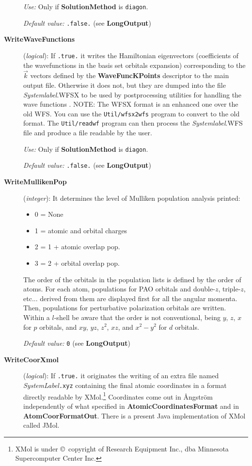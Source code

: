 \documentclass[11pt]{article}
\begin{document}
\begin{description}
{\it Use:} Only if {\bf SolutionMethod} is {\tt diagon}.
 
{\it Default value:} {\tt .false.} (see {\bf LongOutput})

\item[{\bf WriteWaveFunctions}] ({\it logical}): 
 If {\tt .true.} it writes
the Hamiltonian eigenvectors (coefficients of the wavefunctions
in the basis set orbitals expansion) corresponding to the $\vec k$ vectors
defined by the {\bf WaveFuncKPoints}
descriptor to the main output file.  Otherwise it does
not, but they are dumped into the file {\it Systemlabel}.WFSX
to be used by postprocessing utilities for handling the 
wave functions
. NOTE: The WFSX format is an enhanced one
over the old WFS. You can use the {\tt Util/wfsx2wfs} program to
convert to the old format. The {\tt Util/readwf} program
can then process the {\it Systemlabel}.WFS file and produce
a file readable by the user.

{\it Use:} Only if {\bf SolutionMethod} is {\tt diagon}.
 
{\it Default value:} {\tt .false.} (see {\bf LongOutput})


\item[{\bf WriteMullikenPop}] ({\it integer}): 
It determines the level of Mulliken population analysis printed:
\begin{itemize}
\item 0 = None
\item 1 = atomic and orbital charges
\item 2 = 1 + atomic overlap pop.
\item 3 = 2 + orbital overlap pop.
\end{itemize}
The order of the orbitals in the population lists is defined
by the order of atoms. For each atom, populations for PAO orbitals and
double-$z$, triple-$z$, etc... derived from them are displayed first for 
all the angular momenta. Then, populations for perturbative polarization
orbitals are written.
Within a $l$-shell be aware that the order is not
conventional, being $y$, $z$, $x$ for $p$ orbitals, and
$xy$, $yz$, $z^2$, $xz$, and $x^2-y^2$ for $d$ orbitals. 

{\it Default value:} {\tt 0} (see {\bf LongOutput})


\item[{\bf WriteCoorXmol}] ({\it logical}): 
If {\tt .true.} it originates the writing of an extra file
named {\it SystemLabel}{\tt .xyz} containing the final atomic
coordinates in a format directly readable by {\sc XMol}.\footnote{XMol
is under \copyright\ copyright of Research Equipment Inc., dba Minnesota
Supercomputer Center Inc.} Coordinates come out in {\AA}ngstr\"om
independently of what specified in {\bf AtomicCoordinatesFormat} and
in {\bf AtomCoorFormatOut}. There is a present {\sc Java} implementation 
of {\sc XMol} called {\sc JMol}.


\end{description}
\end{document}
